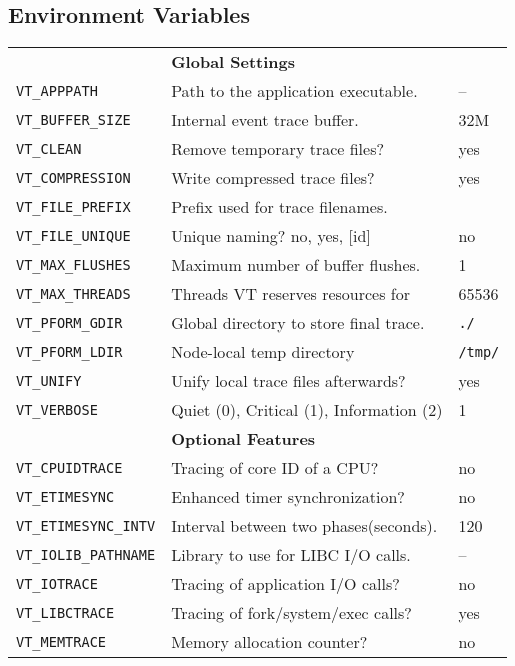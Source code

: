 \begin{multicols}{3}
\section{Environment Variables}
\begin{tabular}{@{}l@{}l@{}l@{}}
\texttt{ } & \textbf{Global Settings} & \texttt{ } \\
\texttt{VT\_APPPATH} & Path to the application executable. & -- \\
\texttt{VT\_BUFFER\_SIZE} & Internal event trace buffer. & 32M \\
\texttt{VT\_CLEAN} & Remove temporary trace files? & yes \\
\texttt{VT\_COMPRESSION} & Write compressed trace files?  & yes \\
\texttt{VT\_FILE\_PREFIX} & Prefix used for trace filenames. & \\
\texttt{VT\_FILE\_UNIQUE} & Unique naming? no, yes, [id] & no \\
\texttt{VT\_MAX\_FLUSHES} & Maximum number of buffer flushes. &	1 \\
\texttt{VT\_MAX\_THREADS} & Threads VT reserves resources for &	65536 \\
\texttt{VT\_PFORM\_GDIR} & Global directory to store final trace. & \texttt{./} \\
\texttt{VT\_PFORM\_LDIR} & Node-local temp directory & \texttt{/tmp/} \\
\texttt{VT\_UNIFY} & Unify local trace files afterwards? & yes \\
\texttt{VT\_VERBOSE} & Quiet (0), Critical (1), Information (2) & 1 \\
\texttt{ } & \textbf{Optional Features} & \texttt{ } \\
\texttt{VT\_CPUIDTRACE} & Tracing of core ID of a CPU? & no \\
\texttt{VT\_ETIMESYNC} & Enhanced timer synchronization? & no \\
\texttt{VT\_ETIMESYNC\_INTV} & Interval between two phases(seconds). & 120 \\
\texttt{VT\_IOLIB\_PATHNAME} & Library to use for LIBC I/O calls. & -- \\
\texttt{VT\_IOTRACE} & Tracing of application I/O calls? & no \\
\texttt{VT\_LIBCTRACE} & Tracing of fork/system/exec calls? & yes \\
\texttt{VT\_MEMTRACE} & Memory allocation counter? & no \\

\end{tabular}
\end{multicols}
